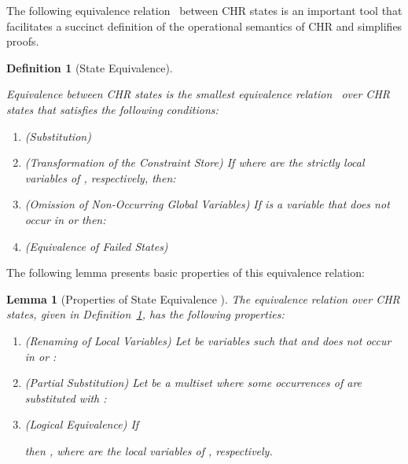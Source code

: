 \documentclass{tlp}
\newtheorem{lemma}[theorem]{Lemma}
\newtheorem{definition}{Definition}[section]
\begin{document}
The following equivalence relation~ between CHR states \cite{Raiser2009a}
is an important tool that facilitates a succinct definition of the operational
semantics of CHR and simplifies proofs.

\begin{definition}[State Equivalence]
\label{def:equiv}

Equivalence between CHR states is the smallest equivalence relation~
over CHR states that satisfies the following conditions:

\begin{enumerate}
\item \label{cond:subst} \emph{(Substitution)}

\item \label{cond:ct} \emph{(Transformation of the Constraint Store)} If
 where  are the strictly local variables of , respectively,
then:

\item \label{cond:global} \emph{(Omission of Non-Occurring Global Variables)} If
 is a variable that does not occur in  or  then:

\item \label{cond:fail} \emph{(Equivalence of Failed States)}

\end{enumerate}

\end{definition}

The following lemma presents basic properties of this equivalence relation:

\begin{lemma}[Properties of State Equivalence \cite{Raiser2009a}]
\label{lem:equiv_props}
The equivalence relation over CHR states, given in Definition~\ref{def:equiv},
has the following properties:

\begin{enumerate}
\item \label{prop:rename} \emph{(Renaming of Local Variables)} Let  be
variables such that  and  does not occur in  or :

\item \label{prop:partial} \emph{(Partial Substitution)} Let  be a
multiset where \emph{some} occurrences of  are substituted with :

\item \label{prop:lequiv} \emph{(Logical Equivalence)} If

then ,  where  are the local
variables of , respectively.
\end{enumerate}
\end{lemma}
\end{document}
